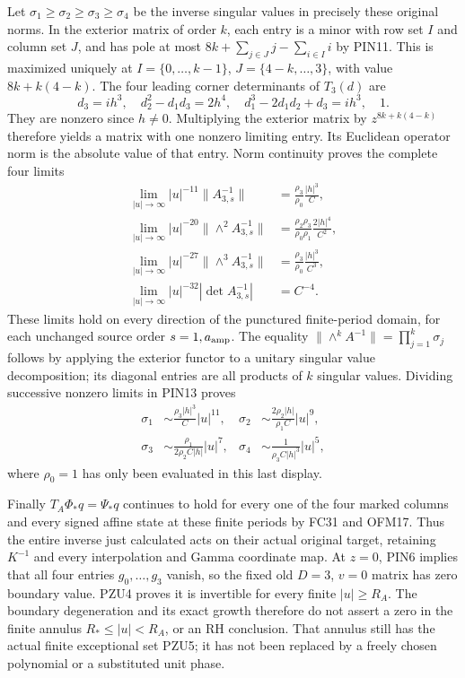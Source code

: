 Let $\sigma_1\ge\sigma_2\ge\sigma_3\ge\sigma_4$ be the inverse
singular values in precisely these original norms. In the exterior
matrix of order $k$, each entry is a minor with row set $I$ and
column set $J$, and has pole at most
$8k+\sum_{j\in J}j-\sum_{i\in I}i$ by PIN11. This is maximized
uniquely at $I=\{0,\ldots,k-1\}$,
$J=\{4-k,\ldots,3\}$, with value $8k+k(4-k)$.
The four leading corner determinants of $T_3(d)$ are
\[
 d_3=ih^3,\quad d_2^2-d_1d_3=2h^4,\quad
 d_1^3-2d_1d_2+d_3=ih^3,\quad 1.
 \tag{PIN12}
\]
They are nonzero since $h\ne0$. Multiplying the exterior matrix
by $z^{8k+k(4-k)}$ therefore yields a matrix with one nonzero
limiting entry. Its Euclidean operator norm is the absolute value
of that entry. Norm continuity proves the complete four limits
\[
 \begin{split}
 \lim_{|u|\to\infty}|u|^{-11}\|A_{3,s}^{-1}\|
       &=\frac{\rho_3}{\rho_0}\frac{|h|^3}{C},\\
 \lim_{|u|\to\infty}|u|^{-20}\|\wedge^2 A_{3,s}^{-1}\|
       &=\frac{\rho_2\rho_3}{\rho_0\rho_1}\frac{2|h|^4}{C^2},\\
 \lim_{|u|\to\infty}|u|^{-27}\|\wedge^3 A_{3,s}^{-1}\|
       &=\frac{\rho_3}{\rho_0}\frac{|h|^3}{C^3},\\
 \lim_{|u|\to\infty}|u|^{-32}|\det A_{3,s}^{-1}|
       &=C^{-4}.
 \end{split}\tag{PIN13}
\]
These limits hold on every direction of the punctured finite-period
domain, for each unchanged source order $s=1,a_{\rm amp}$.
The equality $\|\wedge^k A^{-1}\|=\prod_{j=1}^k\sigma_j$
follows by applying the exterior functor to a unitary singular value
decomposition; its diagonal entries are all products of $k$ singular
values. Dividing successive nonzero limits in PIN13 proves
\[
 \begin{aligned}
 \sigma_1&\sim\frac{\rho_3|h|^3}{C}|u|^{11},&
 \sigma_2&\sim\frac{2\rho_2|h|}{\rho_1 C}|u|^9,\\
 \sigma_3&\sim\frac{\rho_1}{2\rho_2 C|h|}|u|^7,&
 \sigma_4&\sim\frac{1}{\rho_3C|h|^3}|u|^5,
 \end{aligned}\tag{PIN14}
\]
where $\rho_0=1$ has only been evaluated in this last display.

Finally $T_A\Phi_*q=\Psi_*q$ continues to hold for every one of
the four marked columns and every signed affine state at these
finite periods by FC31 and OFM17. Thus the entire inverse just
calculated acts on their actual original target, retaining $K^{-1}$
and every interpolation and Gamma coordinate map. At $z=0$, PIN6
implies that all four entries $g_0,\ldots,g_3$ vanish, so the fixed
old $D=3$, $v=0$ matrix has zero boundary value. PZU4 proves it is
invertible for every finite $|u|\ge R_A$. The boundary degeneration
and its exact growth therefore do not assert a zero in the finite
annulus $R_*\le|u|<R_A$, or an RH conclusion. That annulus still
has the actual finite exceptional set PZU5; it has not been replaced
by a freely chosen polynomial or a substituted unit phase.
